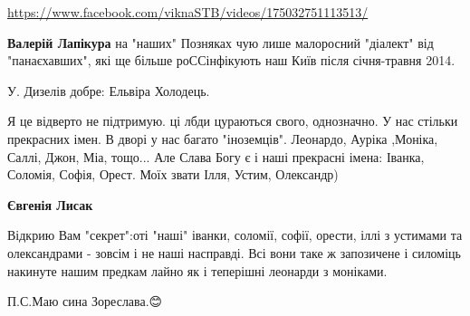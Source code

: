 \begin{itemize}
\begin{itemize}
\url{https://www.facebook.com/viknaSTB/videos/175032751113513/}

 
\textbf{Валерій Лапікура} на "наших" Позняках чую лише малоросний "діалект" від
"панаєхавших", які ще більше роССінфікують наш Київ після січня-травня 2014.
\end{itemize}

 
У. Дизелів добре: Ельвіра Холодець.

 

Я це відверто не підтримую. ці лбди цураються свого, однозначно. У нас стільки
прекрасних імен. В дворі у нас багато "іноземців". Леонардо, Ауріка
,Моніка, Саллі, Джон, Міа, тощо... Але Слава Богу є і наші прекрасні імена:
Іванка, Соломія, Софія, Орест. Моїх звати Ілля, Устим, Олександр)

\begin{itemize}
 
\textbf{Євгенія Лисак} 

Відкрию Вам "секрет":оті "наші" іванки, соломії, софії, орести, іллі з устимами та
олександрами - зовсім і не наші насправді. Всі вони таке ж запозичене і силоміць
накинуте нашим предкам лайно як і теперішні леонарди з моніками.🤣🤣🤣

П.С.Маю сина Зореслава.😊


 

\end{itemize}
\end{itemize}

